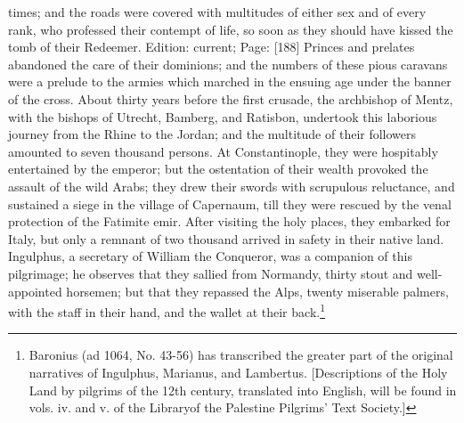 times; and the roads were covered with multitudes of either sex and of every rank, who professed their contempt of life, so soon as they should have kissed the tomb of their Redeemer. Edition: current; Page: [188] Princes and prelates abandoned the care of their dominions; and the numbers of these pious caravans were a prelude to the armies which marched in the ensuing age under the banner of the cross. About thirty years before the first crusade, the archbishop of Mentz, with the bishops of Utrecht, Bamberg, and Ratisbon, undertook this laborious journey from the Rhine to the Jordan; and the multitude of their followers amounted to seven thousand persons. At Constantinople, they were hospitably entertained by the emperor; but the ostentation of their wealth provoked the assault of the wild Arabs; they drew their swords with scrupulous reluctance, and sustained a siege in the village of Capernaum, till they were rescued by the venal protection of the Fatimite emir. After visiting the holy places, they embarked for Italy, but only a remnant of two thousand arrived in safety in their native land. Ingulphus, a secretary of William the Conqueror, was a companion of this pilgrimage; he observes that they sallied from Normandy, thirty stout and well-appointed horsemen; but that they repassed the Alps, twenty miserable palmers, with the staff in their hand, and the wallet at their back.\footnote{Baronius (ad 1064, No. 43-56) has transcribed the greater part of the original narratives of Ingulphus, Marianus, and Lambertus. [Descriptions of the Holy Land by pilgrims of the 12th century, translated into English, will be found in vols. iv. and v. of the Libraryof the Palestine Pilgrims\texthebrew{}’ Text Society.]}

